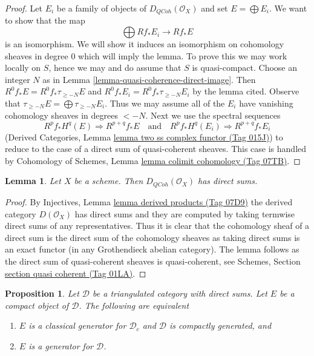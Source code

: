 \documentclass{amsart}
\theoremstyle{plain}
\newtheorem{proposition}[subsection]{Proposition}
\newtheorem{lemma}[subsection]{Lemma}
\theoremstyle{definition}
\theoremstyle{remark}
\numberwithin{equation}{subsection}
\def\QCoh{\mathit{QCoh}}
\begin{document}
\begin{proof}
Let $E_i$ be a family of objects of $D_\QCoh(\mathcal{O}_X)$
and set $E = \bigoplus E_i$. We want to show that the map
$$
\bigoplus Rf_*E_i \longrightarrow Rf_*E
$$
is an isomorphism. We will show it induces an isomorphism on
cohomology sheaves in degree $0$ which will imply the lemma.
To prove this we may work locally on $S$, hence we may and do
assume that $S$ is quasi-compact.
Choose an integer $N$ as in Lemma \ref{lemma-quasi-coherence-direct-image}.
Then $R^0f_*E = R^0f_*\tau_{\geq -N}E$ and
$R^0f_*E_i = R^0f_*\tau_{\geq -N}E_i$ by the lemma cited. Observe that
$\tau_{\geq -N}E = \bigoplus \tau_{\geq -N}E_i$.
Thus we may assume all of the $E_i$ have vanishing cohomology
sheaves in degrees $< -N$. Next we use the spectral sequences
$$
R^pf_*H^q(E) \Rightarrow R^{p + q}f_*E
\quad\text{and}\quad
R^pf_*H^q(E_i) \Rightarrow R^{p + q}f_*E_i
$$
(Derived Categories, Lemma \href{https://stacks.math.columbia.edu/tag/015J}{lemma two ss complex functor (Tag 015J)})
to reduce to the case of a direct sum of quasi-coherent sheaves.
This case is handled by
Cohomology of Schemes, Lemma \href{https://stacks.math.columbia.edu/tag/07TB}{lemma colimit cohomology (Tag 07TB)}.
\end{proof}


\begin{lemma}
\label{lemma-quasi-coherence-direct-sums}
Let $X$ be a scheme. Then $D_\QCoh(\mathcal{O}_X)$
has direct sums.
\end{lemma}

\begin{proof}
By Injectives, Lemma \href{https://stacks.math.columbia.edu/tag/07D9}{lemma derived products (Tag 07D9)}
the derived category $D(\mathcal{O}_X)$ has direct sums and
they are computed by taking termwise direct sums of any representatives.
Thus it is clear that the cohomology sheaf of a direct sum is the
direct sum of the cohomology sheaves as taking direct sums is
an exact functor (in any Grothendieck abelian category). The lemma
follows as the direct sum of quasi-coherent sheaves is quasi-coherent, see
Schemes, Section \href{https://stacks.math.columbia.edu/tag/01LA}{section quasi coherent (Tag 01LA)}.
\end{proof}


\begin{proposition}
\label{derived-proposition-generator-versus-classical-generator}
Let $\mathcal{D}$ be a triangulated category with direct sums.
Let $E$ be a compact object of $\mathcal{D}$.
The following are equivalent
\begin{enumerate}
\item $E$ is a classical generator for $\mathcal{D}_c$ and
$\mathcal{D}$ is compactly generated, and
\item $E$ is a generator for $\mathcal{D}$.
\end{enumerate}
\end{proposition}
\end{document}
